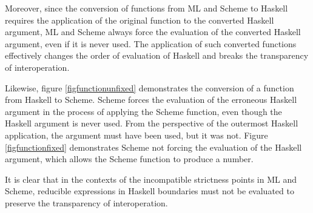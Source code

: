 Moreover, since the conversion of functions from ML and Scheme to Haskell requires the application of the original function to the converted Haskell argument, ML and Scheme always force the evaluation of the converted Haskell argument, even if it is never used. The application of such converted functions effectively changes the order of evaluation of Haskell and breaks the transparency of interoperation.





Likewise, figure \ref{figfunctionunfixed} demonstrates the conversion of a function from Haskell to Scheme. Scheme forces the evaluation of the erroneous Haskell argument in the process of applying the Scheme function, even though the Haskell argument is never used. From the perspective of the outermost Haskell application, the argument must have been used, but it was not. Figure \ref{figfunctionfixed} demonstrates Scheme not forcing the evaluation of the Haskell argument, which allows the Scheme function to produce a number.

It is clear that in the contexts of the incompatible strictness points in ML and Scheme, reducible expressions in Haskell boundaries must not be evaluated to preserve the transparency of interoperation.